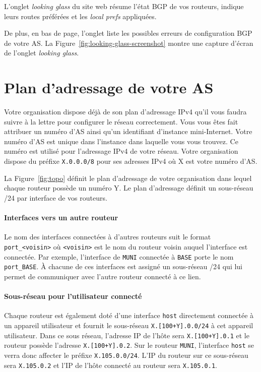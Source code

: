 \documentclass[a4paper, 11pt]{article}
\begin{document}
L'onglet \textit{looking glass} du site web résume l'état BGP de vos routeurs,
indique leurs routes préférées et les \textit{local prefs} appliquées.

De plus, en bas de page, l'onglet liste les possibles erreurs de configuration
BGP de votre AS. La Figure~\ref{fig:looking-glass-screenshot} montre une capture
d'écran de l'onglet \textit{looking glass}.


\section{Plan d'adressage de votre AS}\label{sec:plan-adressage}

Votre organisation dispose déjà de son plan d'adressage IPv4 qu'il
vous faudra suivre à la lettre pour configurer le réseau correctement.
Vous vous êtes fait attribuer un numéro d'AS ainsi qu'un identifiant
d'instance mini-Internet. Votre numéro d'AS est unique dans l'instance
dans laquelle vous vous trouvez. Ce numéro est utilisé pour l'adressage
IPv4 de votre réseau. Votre organisation dispose du préfixe
\texttt{X.0.0.0/8} pour ses adresses IPv4 où X est votre numéro d'AS.

La Figure~\ref{fig:topo} définit le plan d'adressage de votre organisation
dans lequel chaque routeur possède un numéro Y. Le plan d'adressage
définit un sous-réseau /24 par interface de vos routeurs.

\paragraph*{Interfaces vers un autre routeur}
Le nom des interfaces
connectées à d'autres routeurs suit le format \texttt{port\_<voisin>}
où \texttt{<voisin>} est le nom du routeur voisin auquel l'interface
est connectée. Par exemple, l'interface de \texttt{MUNI} connectée à
\texttt{BASE} porte le nom \texttt{port\_BASE}.
À chacune de ces interfaces est assigné un sous-réseau /24 qui lui permet
de communiquer avec l'autre routeur connecté à ce lien.

\paragraph*{Sous-réseau pour l'utilisateur connecté}
Chaque routeur est également doté d'une interface \texttt{host}
directement connectée
à un appareil utilisateur et fournit le sous-réseau
\texttt{X.[100+Y].0.0/24} à cet appareil utilisateur.
Dans ce sous réseau, l'adresse IP de l'hôte sera \texttt{X.[100+Y].0.1}
et le routeur possède l'adresse \texttt{X.[100+Y].0.2}. Sur le routeur
\texttt{MUNI}, l'interface \texttt{host} se verra donc affecter
le préfixe \texttt{X.105.0.0/24}. L'IP du routeur sur ce sous-réseau
sera \texttt{X.105.0.2} et l'IP de l'hôte connecté au routeur
sera \texttt{X.105.0.1}.
\end{document}
